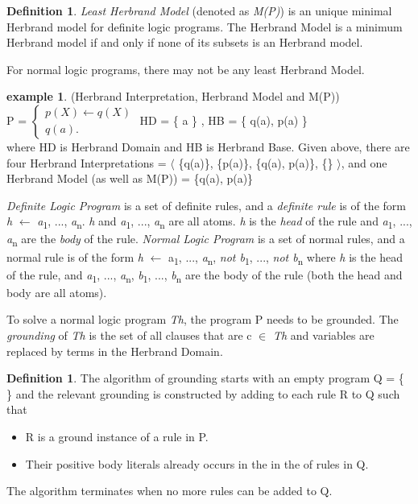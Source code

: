 \documentclass[12pt,twoside]{report}
\theoremstyle{plain}
\theoremstyle{definition}
\newtheorem{defn}[thm]{Definition} %
\newtheorem{examp}{example}[section]
\begin{document}
\begin{defn}
\textit{Least Herbrand Model} (denoted as \textit{M(P)}) is an unique minimal Herbrand model for definite logic programs.  The Herbrand Model is a minimum Herbrand model if and only if none of its subsets is an Herbrand model.
\end{defn}
For normal logic programs, there may not be any least Herbrand Model.


\begin{examp} \normalfont (Herbrand Interpretation, Herbrand Model and M(P)) \\

P = $\begin{cases}
	p(X)  \leftarrow q(X) \\
	q (a).
      \end{cases}$
HD = \{ a \} , HB = \{ q(a), p(a) \}  \\

where HD is Herbrand Domain and HB is Herbrand Base.
Given above,  there are four Herbrand Interpretations = $\langle$ \{q(a)\}, \{p(a)\}, \{q(a), p(a)\}, \{\} $\rangle$, and one Herbrand Model (as well as M(P)) = \{q(a), p(a)\}

\end{examp}

\textit{Definite Logic Program} is a set of definite rules, and  a \textit{definite rule} is of the form \textit{h} $\leftarrow$ \textit{a}\textsubscript{1}, ..., \textit{a}\textsubscript{n}.  \textit{h} and  \textit{a}\textsubscript{1}, ..., \textit{a}\textsubscript{n} are all atoms. \textit{h} is the \textit{head} of the rule and \textit{a}\textsubscript{1}, ..., \textit{a}\textsubscript{n} are the \textit{body} of the rule.
\textit{Normal Logic Program} is a set of normal rules, and a normal rule is of the form \textit{h} $\leftarrow$ a\textsubscript{1}, ..., \textit{a}\textsubscript{n}, \textit{not b}\textsubscript{1}, ..., \textit{not  b}\textsubscript{n} where \textit{h} is the head of the rule,
 and \textit{a}\textsubscript{1}, ..., \textit{a}\textsubscript{n}, \textit{b}\textsubscript{1}, ..., \textit{b}\textsubscript{n} are the body of the rule (both the head and body are all atoms).

To solve a normal logic program \textit{Th}, the program P needs to be grounded. The \textit{grounding} of \textit{Th} is the set of all clauses that are c $\in$ \textit{Th} and variables are replaced by terms in the Herbrand Domain. 
\begin{defn}
The algorithm of grounding starts with an empty program Q = \{  \} and the relevant grounding is constructed by adding to each rule R to Q such that
\begin{itemize}
\item R is a ground instance of a rule in P.
\item Their positive body literals already occurs in the in the of rules in Q. 
\end{itemize}
The algorithm terminates when no more rules can be added to Q.

\end{defn}
\end{document}
